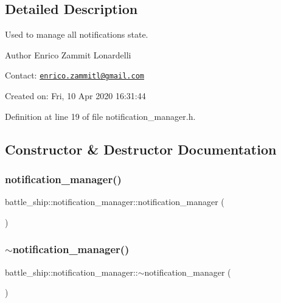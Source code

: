 \subsection{Detailed Description}
Used to manage all notifications state. 

\begin{DoxyAuthor}{Author}
Enrico Zammit Lonardelli
\end{DoxyAuthor}
Contact\+: \href{mailto:enrico.zammitl@gmail.com}{\tt enrico.\+zammitl@gmail.\+com}

Created on\+: Fri, 10 Apr 2020 16\+:31\+:44 

Definition at line 19 of file notification\+\_\+manager.\+h.



\subsection{Constructor \& Destructor Documentation}
\mbox{\label{classbattle__ship_1_1notification__manager_a87ccb2f8410219be087e216ae0dd0512}} 
\subsubsection{\texorpdfstring{notification\+\_\+manager()}{notification\_manager()}}
{\footnotesize\ttfamily battle\+\_\+ship\+::notification\+\_\+manager\+::notification\+\_\+manager (\begin{DoxyParamCaption}{ }\end{DoxyParamCaption})\hspace{0.3cm}{\ttfamily [default]}}

\mbox{\label{classbattle__ship_1_1notification__manager_ac6581333d9b6fb0fd4d66432bab5e1f4}} 
\subsubsection{\texorpdfstring{$\sim$notification\+\_\+manager()}{~notification\_manager()}}
{\footnotesize\ttfamily battle\+\_\+ship\+::notification\+\_\+manager\+::$\sim$notification\+\_\+manager (\begin{DoxyParamCaption}{ }\end{DoxyParamCaption})\hspace{0.3cm}{\ttfamily [default]}}



